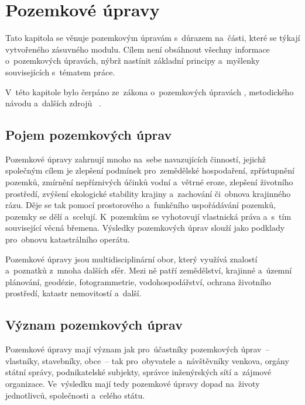 \chapter{Pozemkové úpravy}
\label{pu}

Tato kapitola se věnuje pozemkovým úpravám s~důrazem na~části, které
se týkají vytvořeného zásuvného modulu. Cílem není obsáhnout všechny
informace o~pozemkových úpravách, nýbrž nastínit základní principy
a~myšlenky souvisejících s~tématem práce.

V~této kapitole bylo čerpáno ze~zákona o~pozemkových úpravách
\citep{pu_zakon}, metodic\-kého návodu \citep{metodicky_navod}
a~dalších zdrojů \citep{pu_cr}~\citep{pu_skripta}.

\section{Pojem pozemkových úprav}
\label{pojem_pu}

Pozemkové úpravy zahrnují mnoho na~sebe navazujících činností, jejichž
společným cílem je zlepšení podmínek pro~zemědělské hospodaření,
zpřístupnění pozemků, zmírnění nepříznivých účinků vodní a~větrné
eroze, zlepšení životního prostředí, zvýšení ekologické stability
krajiny a~zachování či~obnova krajinného rázu. Děje se tak pomocí
prostorového a~funkčního uspořádávání pozemků, pozemky se dělí
a~scelují. K~pozemkům se vyhotovují vlastnická práva a~s~tím
související věcná břemena. Výsledky pozemkových úprav slouží jako
podklady pro~obnovu katastrálního operátu.

Pozemkové úpravy jsou multidisciplinární obor, který využívá znalostí
a~poznatků z~mnoha dalších sfér. Mezi ně patří zemědělství, krajinné
a~územní plánování, geodézie, fotogrammetrie, vodohospodářství,
ochrana životního prostředí, katastr nemovitostí a~další.

\section{Význam pozemkových úprav}
\label{vyznam_pu}

Pozemkové úpravy mají význam jak pro~účastníky pozemkových úprav~–
vlastníky, stavebníky, obce~– tak pro~obyvatele a~návštěvníky venkova,
orgány státní správy, podnikatelské subjekty, správce inženýrských
sítí a~zájmové organizace. Ve~výsledku mají tedy pozemkové úpravy
dopad na~životy jednotlivců, společnosti a~celého státu.

